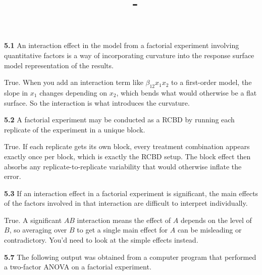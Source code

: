 \documentclass[answers,12pt,addpoints]{exam}
\author{\name}
\title{\course \ - \assignment}
\begin{document}
\maketitle

\newpage
 
 
\textbf{5.1} An interaction effect in the model from a factorial experiment involving quantitative factors is a way of incorporating curvature into the response surface model representation of the results.

\begin{solution}
True. When you add an interaction term like $\beta_{12}x_1x_2$ to a first-order model, the slope in $x_1$ changes depending on $x_2$, which bends what would otherwise be a flat surface. So the interaction is what introduces the curvature.
\end{solution}

\textbf{5.2} A factorial experiment may be conducted as a RCBD by running each replicate of the experiment in a unique block.

\begin{solution}
True. If each replicate gets its own block, every treatment combination appears exactly once per block, which is exactly the RCBD setup. The block effect then absorbs any replicate-to-replicate variability that would otherwise inflate the error.
\end{solution}

\textbf{5.3} If an interaction effect in a factorial experiment is significant, the main effects of the factors involved in that interaction are difficult to interpret individually.

\begin{solution}
True. A significant $AB$ interaction means the effect of $A$ depends on the level of $B$, so averaging over $B$ to get a single main effect for $A$ can be misleading or contradictory. You'd need to look at the simple effects instead.
\end{solution}

\textbf{5.7} The following output was obtained from a computer program that
performed a two-factor ANOVA on a factorial experiment.
\end{document}
